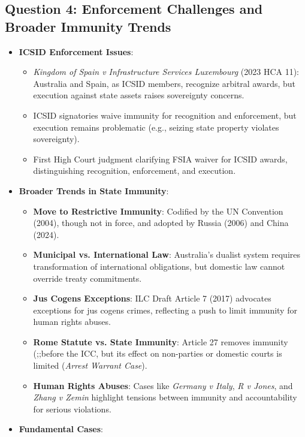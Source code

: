 \subsection{Question 4: Enforcement Challenges and Broader Immunity Trends}
\begin{itemize}
    \item \textbf{ICSID Enforcement Issues}:
    \begin{itemize}
        \item \textit{Kingdom of Spain v Infrastructure Services Luxembourg} (2023 HCA 11): Australia and Spain, as ICSID members, recognize arbitral awards, but execution against state assets raises sovereignty concerns.
        \item ICSID signatories waive immunity for recognition and enforcement, but execution remains problematic (e.g., seizing state property violates sovereignty).
        \item First High Court judgment clarifying FSIA waiver for ICSID awards, distinguishing recognition, enforcement, and execution.
    \end{itemize}
    \item \textbf{Broader Trends in State Immunity}:
    \begin{itemize}
        \item \textbf{Move to Restrictive Immunity}: Codified by the UN Convention (2004), though not in force, and adopted by Russia (2006) and China (2024).
        \item \textbf{Municipal vs. International Law}: Australia’s dualist system requires transformation of international obligations, but domestic law cannot override treaty commitments.
        \item \textbf{Jus Cogens Exceptions}: ILC Draft Article 7 (2017) advocates exceptions for jus cogens crimes, reflecting a push to limit immunity for human rights abuses.
        \item \textbf{Rome Statute vs. State Immunity}: Article 27 removes immunity (;;before the ICC, but its effect on non-parties or domestic courts is limited (\textit{Arrest Warrant Case}).
        \item \textbf{Human Rights Abuses}: Cases like \textit{Germany v Italy}, \textit{R v Jones}, and \textit{Zhang v Zemin} highlight tensions between immunity and accountability for serious violations.
    \end{itemize}
    \item \textbf{Fundamental Cases}:
    \begin{itemize}

\end{itemize}
\end{itemize}
